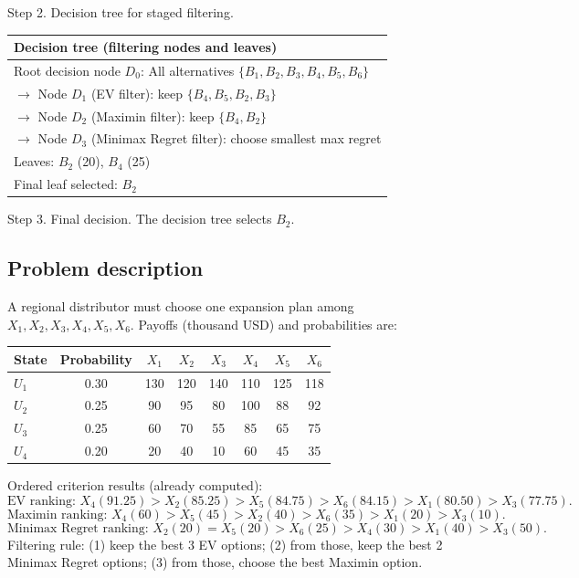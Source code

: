 \begin{ExamProblems}
		Step 2. Decision tree for staged filtering.
		\begin{center}
			\begin{tabular}{l}
				\toprule
				Decision tree (filtering nodes and leaves) \\
				\midrule
				Root decision node $D_0$: All alternatives $\{B_1,B_2,B_3,B_4,B_5,B_6\}$ \\
				$\rightarrow$ Node $D_1$ (EV filter): keep $\{B_4,B_5,B_2,B_3\}$ \\
				$\rightarrow$ Node $D_2$ (Maximin filter): keep $\{B_4,B_2\}$ \\
				$\rightarrow$ Node $D_3$ (Minimax Regret filter): choose smallest max regret \\
				Leaves: $B_2$ (20), $B_4$ (25) \\
				Final leaf selected: $B_2$ \\
				\bottomrule
			\end{tabular}
		\end{center}

		Step 3. Final decision.
		The decision tree selects $B_2$.

		\newpage
		\item\leavevmode\par
		\subsection*{Problem description}
		A regional distributor must choose one expansion plan among $X_1,X_2,X_3,X_4,X_5,X_6$.
		Payoffs (thousand USD) and probabilities are:
		\begin{center}
			\begin{tabular}{l c c c c c c c}
				\toprule
				State & Probability & $X_1$ & $X_2$ & $X_3$ & $X_4$ & $X_5$ & $X_6$ \\
				\midrule
				$U_1$ & 0.30 & 130 & 120 & 140 & 110 & 125 & 118 \\
				$U_2$ & 0.25 & 90 & 95 & 80 & 100 & 88 & 92 \\
				$U_3$ & 0.25 & 60 & 70 & 55 & 85 & 65 & 75 \\
				$U_4$ & 0.20 & 20 & 40 & 10 & 60 & 45 & 35 \\
				\bottomrule
			\end{tabular}
		\end{center}
		Ordered criterion results (already computed):
		\[
		\text{EV ranking: }X_4(91.25)>X_2(85.25)>X_5(84.75)>X_6(84.15)>X_1(80.50)>X_3(77.75).
		\]
		\[
		\text{Maximin ranking: }X_4(60)>X_5(45)>X_2(40)>X_6(35)>X_1(20)>X_3(10).
		\]
		\[
		\text{Minimax Regret ranking: }X_2(20)=X_5(20)>X_6(25)>X_4(30)>X_1(40)>X_3(50).
		\]
		Filtering rule:
		(1) keep the best 3 EV options;
		(2) from those, keep the best 2 Minimax Regret options;
		(3) from those, choose the best Maximin option.


\end{ExamProblems}
